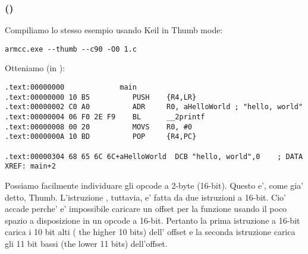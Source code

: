 \subsubsection{\NonOptimizingKeilVI (\ThumbMode)}

Compiliamo lo stesso esempio usando Keil in Thumb mode:

\begin{lstlisting}
armcc.exe --thumb --c90 -O0 1.c 
\end{lstlisting}

Otteniamo (in \IDA):

\begin{lstlisting}[caption=\NonOptimizingKeilVI (\ThumbMode) + \IDA,style=customasmARM]
.text:00000000             main
.text:00000000 10 B5          PUSH    {R4,LR}
.text:00000002 C0 A0          ADR     R0, aHelloWorld ; "hello, world"
.text:00000004 06 F0 2E F9    BL      __2printf
.text:00000008 00 20          MOVS    R0, #0
.text:0000000A 10 BD          POP     {R4,PC}

.text:00000304 68 65 6C 6C+aHelloWorld  DCB "hello, world",0    ; DATA XREF: main+2
\end{lstlisting}

Possiamo facilmente individuare gli opcode a 2-byte (16-bit). Questo e', come gia' detto, Thumb.
L'istruzione  , tuttavia, e' fatta da due istruzioni a 16-bit.
Cio' accade perche' e' impossibile caricare un offset per la funzione \printf usando il poco spazio a disposizione in un opcode a 16-bit.
Pertanto la prima istruzione a 16-bit carica i 10 bit alti ( the higher 10 bits) dell' offset e la seconda istruzione carica
gli 11 bit bassi (the lower 11 bits) dell'offset.



